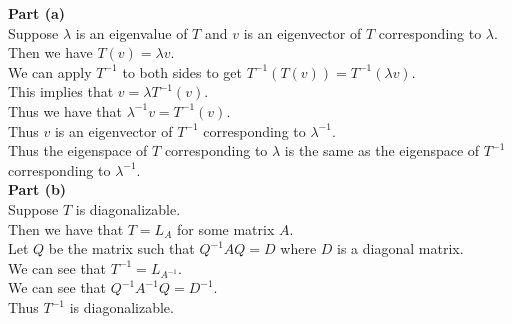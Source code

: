 \documentclass[answers,12pt,addpoints]{exam}
\begin{document}
\begin{questions}
    \begin{solution}
        \textbf{Part (a)}\\
        Suppose $\lambda$ is an eigenvalue of $T$ and $v$ is an eigenvector of $T$ corresponding to $\lambda$.\\
        Then we have $T(v) = \lambda v$.\\
        We can apply $T^{-1}$ to both sides to get $T^{-1}(T(v)) = T^{-1}(\lambda v)$.\\
        This implies that $v = \lambda T^{-1}(v)$.\\
        Thus we have that $\lambda^{-1} v = T^{-1}(v)$.\\
        Thus $v$ is an eigenvector of $T^{-1}$ corresponding to $\lambda^{-1}$.\\
        Thus the eigenspace of $T$ corresponding to $\lambda$ is the same as the eigenspace of $T^{-1}$ corresponding to $\lambda^{-1}$.\\
        \textbf{Part (b)}\\
        Suppose $T$ is diagonalizable.\\
        Then we have that $T = L_A$ for some matrix $A$.\\
        Let $Q$ be the matrix such that $Q^{-1}AQ = D$ where $D$ is a diagonal matrix.\\
        We can see that $T^{-1} = L_{A^{-1}}$.\\
        We can see that $Q^{-1}A^{-1}Q = D^{-1}$.\\
        Thus $T^{-1}$ is diagonalizable.
    \end{solution}


\end{questions}
\end{document}
